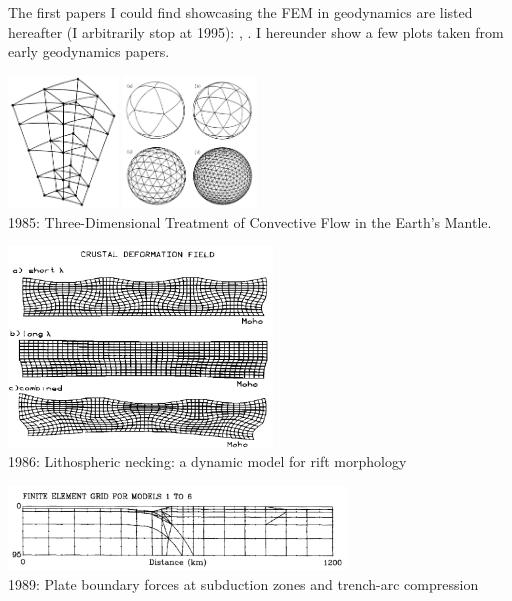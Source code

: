 
The first papers I could find showcasing the FEM in geodynamics are listed hereafter
(I arbitrarily stop at 1995):
\cite{gart78}, 
\cite{anbr80}\cite{mera80}
\cite{engl82}
\cite{thar85}
\cite{enho86}\cite{mofr86}
\cite{zupa86}
\cite{boww89}
\cite{brau94}
\cite{brbe95}.
I hereunder show a few plots taken from early geodynamics papers.


\begin{center}
\begin{minipage}{0.45\textwidth}
\centering
\includegraphics[height=3.5cm]{images/history/baum85a}
\includegraphics[height=3.5cm]{images/history/baum85b}\\
{\scriptsize 1985: Three-Dimensional Treatment of Convective Flow in the Earth's Mantle.
\cite{baum85}}
\end{minipage}\hfill
\begin{minipage}{0.45\textwidth}
\centering
\includegraphics[width=7cm]{images/history/zupf86}\\
{\scriptsize 1986: Lithospheric necking: a dynamic model for rift morphology \cite{zupf86}}
\end{minipage}
\end{center}


\begin{center}
\includegraphics[width=9cm]{images/history/boww89}\\
{\scriptsize 1989: Plate boundary forces at subduction zones and trench-arc compression \cite{boww89}}
\end{center}

